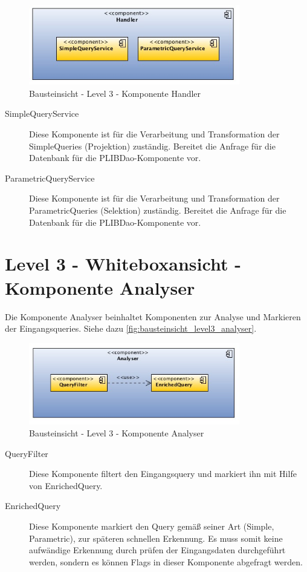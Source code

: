\begin{figure}[htbp]
	\centering
		\includegraphics[width=0.82\textwidth]{images/bausteinsicht_plib_level3_handler.jpg}
	\caption{Bausteinsicht - Level 3 - Komponente Handler}
	\label{fig:bausteinsicht_level3_handler}
\end{figure}

\begin{description}
\item[SimpleQueryService] Diese Komponente ist für die Verarbeitung und Transformation der SimpleQueries (Projektion) zuständig. Bereitet die Anfrage für die Datenbank für die PLIBDao-Komponente vor. 
\item[ParametricQueryService] Diese Komponente ist für die Verarbeitung und Transformation der ParametricQueries (Selektion) zuständig. Bereitet die Anfrage für die Datenbank für die PLIBDao-Komponente vor. 
\end{description}

\section{Level 3 - Whiteboxansicht - Komponente Analyser}

Die Komponente Analyser beinhaltet Komponenten zur Analyse und Markieren der Eingangsqueries. Siehe dazu \autoref{fig:bausteinsicht_level3_analyser}. 

\begin{figure}[htbp]
	\centering
		\includegraphics[width=0.82\textwidth]{images/bausteinsicht_plib_level3_analyser.jpg}
	\caption{Bausteinsicht - Level 3 - Komponente Analyser}
	\label{fig:bausteinsicht_level3_analyser}
\end{figure}

\begin{description}
\item[QueryFilter] Diese Komponente filtert den Eingangsquery und markiert ihn mit Hilfe von EnrichedQuery.
\item[EnrichedQuery] Diese Komponente markiert den Query gemäß seiner Art (Simple, Parametric), zur späteren schnellen Erkennung. Es muss somit keine aufwändige Erkennung durch prüfen der Eingangsdaten durchgeführt werden, sondern es können Flags in dieser Komponente abgefragt werden. 
\end{description}
